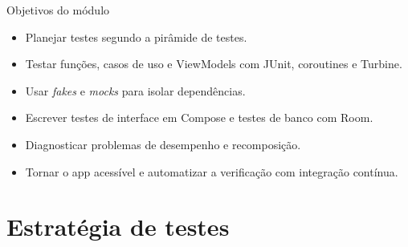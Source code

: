 \documentclass[aspectratio=169,10pt]{beamer}
\begin{document}
\capa

\begin{frame}{Objetivos do módulo}
  \begin{conceito}
    \begin{itemize}
      \item Planejar testes segundo a pirâmide de testes.
      \item Testar funções, casos de uso e ViewModels com JUnit, coroutines e Turbine.
      \item Usar \emph{fakes} e \emph{mocks} para isolar dependências.
      \item Escrever testes de interface em Compose e testes de banco com Room.
      \item Diagnosticar problemas de desempenho e recomposição.
      \item Tornar o app acessível e automatizar a verificação com integração contínua.
    \end{itemize}
  \end{conceito}
\end{frame}

\sumario

\section{Estratégia de testes}
\end{document}
